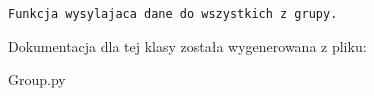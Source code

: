 \footnotesize\begin{verbatim}Funkcja wysylajaca dane do wszystkich z grupy.\end{verbatim}
\normalsize
 

Dokumentacja dla tej klasy została wygenerowana z pliku:\begin{CompactItemize}
\item 
Group.py\end{CompactItemize}
